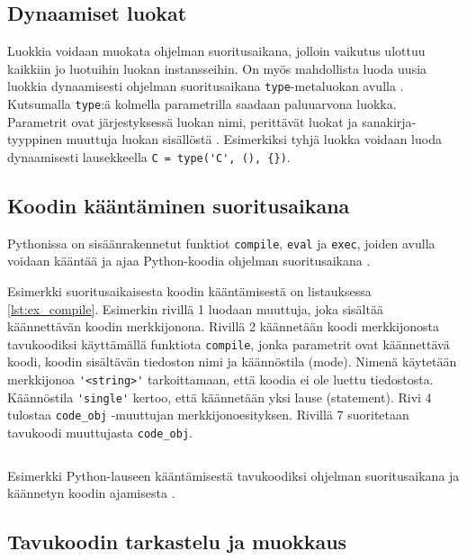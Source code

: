 \documentclass[finnish]{tktltiki2}
\theoremstyle{definition}
\theoremstyle{remark}
\begin{document}

\subsection{Dynaamiset luokat}

Luokkia voidaan muokata ohjelman suoritusaikana, jolloin vaikutus ulottuu kaikkiin jo luotuihin luokan instansseihin. On myös mahdollista luoda uusia luokkia dynaamisesti ohjelman suoritusaikana \verb|type|-metaluokan avulla \cite{MetaprogP3}. Kutsumalla \verb|type|:ä kolmella parametrilla saadaan paluuarvona luokka. Parametrit ovat järjestyksessä luokan nimi, perittävät luokat ja sanakirja-tyyppinen muuttuja luokan sisällöstä \cite{MetaprogP3}. Esimerkiksi tyhjä luokka voidaan luoda dynaamisesti lausekkeella \verb|C = type('C', (), {})|.


\subsection{Koodin kääntäminen suoritusaikana}

Pythonissa on sisäänrakennetut funktiot \verb|compile|, \verb|eval| ja \verb|exec|, joiden avulla voidaan kääntää ja ajaa Python-koodia ohjelman suoritusaikana \cite{codeobjects}.

Esimerkki suoritusaikaisesta koodin kääntämisestä on listauksessa \ref{lst:ex_compile}. Esimerkin rivillä 1 luodaan muuttuja, joka sisältää käännettävän koodin merkkijonona. Rivillä 2 käännetään koodi merkkijonosta tavukoodiksi käyttämällä funktiota \verb|compile|, jonka parametrit ovat käännettävä koodi, koodin sisältävän tiedoston nimi ja käännöstila (mode). Nimenä käytetään merkkijonoa \verb|'<string>'| tarkoittamaan, että koodia ei ole luettu tiedostosta. Käännöstila \verb|'single'| kertoo, että käännetään yksi lause (statement). Rivi 4 tulostaa \verb|code_obj| -muuttujan merkkijonoesityksen. Rivillä 7 suoritetaan tavukoodi muuttujasta \verb|code_obj|.

\begin{listing}
    \inputminted[linenos,frame=single,framesep=10pt]{python}{code/dynamichello.py}
    \caption{Esimerkki Python-lauseen kääntämisestä tavukoodiksi ohjelman suoritusaikana ja käännetyn koodin ajamisesta \cite{codeobjects}.}
    \label{lst:ex_compile}
\end{listing}


\subsection{Tavukoodin tarkastelu ja muokkaus}
\end{document}
